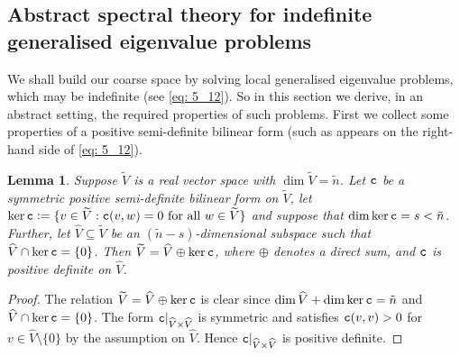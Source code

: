 \documentclass[numbers,webpdf,imaiai]{ima-authoring-template}%
\theoremstyle{thmstyletwo}%
\newtheorem{lemma}[theorem]{Lemma}
\numberwithin{equation}{section}
\newcommand{\txtc}{\textup{\texttt{c}}}
\newcommand{\wV}{\widetilde{V}}
\newcommand{\whV}{\widehat{V}}
\newcommand{\assign}{\mathrel{\mathop:}=}
\numberwithin{equation}{section}
\begin{document}
{\subsection{Abstract spectral theory for indefinite generalised  eigenvalue problems}
\label{subsec:abstract}

We shall build our coarse space by solving 
local generalised eigenvalue problems,  which may be indefinite (see \eqref{eq: 5_12}).  
So in this section we derive, in  an abstract setting, the required properties of such problems.
First we {collect} some properties of a positive semi-definite bilinear form
(such as appears on the right-hand side of \eqref{eq: 5_12}).

\begin{lemma} \label{cpd}
Suppose $\wV$ is a real vector space with $\dim \wV = \tilde n$.   
Let $\txtc$ be a symmetric positive semi-definite bilinear form on $\wV$, 
let $\ker \txtc \assign \{ v \in \wV: \txtc(v,w) = 0 \ \text{for all} \ w \in \wV\}$ 
and suppose that $\dim \ker \txtc = s < \tilde n$. 
Further, let $\whV\subseteq \wV$ be an $(\tilde n-s)$-dimensional subspace such that $\whV\cap\ker\txtc=\{0\}$.
Then $\wV=\whV\oplus\ker\txtc$, where $\oplus$ denotes a direct sum, and $\txtc$ is positive definite on $\whV$.
\end{lemma}

\begin{proof}
The relation $\wV=\whV\oplus\ker\txtc$ is clear since $\dim\whV+\dim\ker\txtc=\tilde n$ and $\whV\cap\ker\txtc=\{0\}$.
The form $\txtc|_{\whV\times\whV}$ is symmetric and satisfies $\txtc(v,v)>0$ for $v\in\whV\setminus\{0\}$ by the assumption on $\whV$.
Hence $\txtc|_{\whV\times\whV}$ is positive definite.
\end{proof}

}
\end{document}
